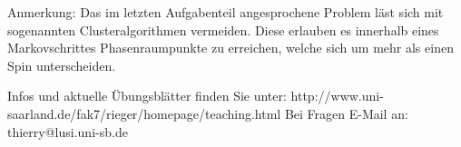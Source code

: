 \documentclass[english,10pt]{exam}
\begin{document}
\begin{questions}
Anmerkung: Das im letzten Aufgabenteil angesprochene 
Problem läst sich mit sogenannten Clusteralgorithmen vermeiden. 
Diese erlauben es innerhalb eines Markovschrittes Phasenraumpunkte zu erreichen, 
welche sich um mehr als einen Spin unterscheiden. 

\end{questions}   
Infos und aktuelle \"Ubungsbl\"atter finden Sie unter: http://www.uni-saarland.de/fak7/rieger/homepage/teaching.html
Bei Fragen E-Mail an: thierry@lusi.uni-sb.de 
\end{document}
